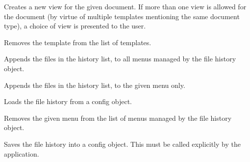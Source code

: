 
Creates a new view for the given document. If more than one view is allowed for the
document (by virtue of multiple templates mentioning the same document type), a choice
of view is presented to the user.

\label{wxdocmanagerdisassociatetemplate}


Removes the template from the list of templates.

\label{wxdocmanagerfilehistoryaddfilestomenu}


Appends the files in the history list, to all menus managed by the file history object.


Appends the files in the history list, to the given menu only.

\label{wxdocmanagerfilehistoryload}


Loads the file history from a config object.



\label{wxdocmanagerfilehistoryremovemenu}


Removes the given menu from the list of menus managed by the file history object.

\label{wxdocmanagerfilehistorysave}


Saves the file history into a config object. This must be called
explicitly by the application.



\label{wxdocmanagerfilehistoryusemenu}

